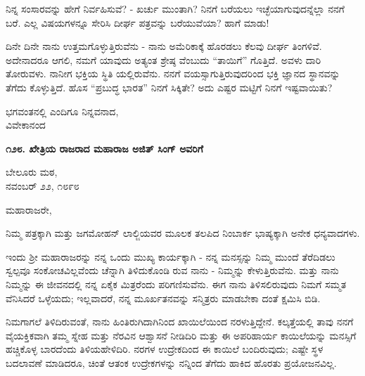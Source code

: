 ನಿನ್ನ ಸಂಸಾರವನ್ನು ಹೇಗೆ ನಿರ್ವಹಿಸುವೆ? - ಖರ್ಚು ಮುಂತಾಗಿ? ನಿನಗೆ ಬರೆಯಲು ಇಚ್ಛೆಯಾಗುವುದನ್ನೆಲ್ಲಾ ನನಗೆ ಬರೆ. ಎಲ್ಲ ವಿಷಯಗಳನ್ನೂ ಸೇರಿಸಿ ದೀರ್ಘ ಪತ್ರವನ್ನು ಬರೆಯುವೆಯಾ? ಹಾಗೆ ಮಾಡು!

ದಿನೇ ದಿನೇ ನಾನು ಉತ್ತಮಗೊಳ್ಳುತ್ತಿರುವೆನು - ನಾನು ಅಮೆರಿಕಾಕ್ಕೆ ಹೊರಡಲು ಕೆಲವು ದೀರ್ಘ ತಿಂಗಳಿವೆ. ಅದೇನಾದರೂ ಆಗಲಿ, ನಮಗೆ ಯಾವುದು ಅತ್ಯಂತ ಶ್ರೇಷ್ಠ ವೆಂಬುದು “ತಾಯಿಗೆ” ಗೊತ್ತಿದೆ. ಅವಳು ದಾರಿ ತೋರುವಳು. ನಾನೀಗ ಭಕ್ತಿಯ ಸ್ಥಿತಿ ಯಲ್ಲಿರುವೆನು. ನನಗೆ ವಯಸ್ಸಾಗುತ್ತಿರುವುದರಿಂದ ಭಕ್ತಿ ಜ್ಞಾನದ ಸ್ಥಾನವನ್ನು ತೆಗೆದು ಕೊಳ್ಳುತ್ತಿದೆ. ಹೊಸ “ಪ್ರಬುದ್ಧ ಭಾರತ” ನಿನಗೆ ಸಿಕ್ಕಿತೇ? ಅದು ಎಷ್ಟರ ಮಟ್ಟಿಗೆ ನಿನಗೆ ಇಷ್ಟವಾಯಿತು?

\begin{flushright}
ಭಗವಂತನಲ್ಲಿ ಎಂದಿಗೂ ನಿನ್ನವನಾದ,\\ವಿವೇಕಾನಂದ
\end{flushright}

\begin{center}
\textbf{೧೨೮. ಖೇತ್ರಿಯ ರಾಜರಾದ ಮಹಾರಾಜ ಅಜಿತ್ ಸಿಂಗ್ ಅವರಿಗೆ}
\end{center}

\begin{flushright}
ಬೇಲೂರು ಮಠ,\\ನವಂಬರ್ ೨೨, ೧೮೯೮
\end{flushright}

ಮಹಾರಾಜರೇ,

ನಿಮ್ಮ ಪತ್ರಕ್ಕಾಗಿ ಮತ್ತು ಜಗಮೋಹನ್ ಲಾಲ್ಜಿಯವರ ಮೂಲಕ ತಲಪಿದ ನಿಂಬಾರ್ಕ ಭಾಷ್ಯಕ್ಕಾಗಿ ಅನೇಕ ಧನ್ಯವಾದಗಳು.

ಇಂದು ಶ‍್ರೀ ಮಹಾರಾಜರನ್ನು ನನ್ನ ಒಂದು ಮುಖ್ಯ ಕಾರ್ಯಕ್ಕಾಗಿ - ನನ್ನ ಮನಸ್ಸನ್ನು ನಿಮ್ಮ ಮುಂದೆ ತೆರೆದಿಡಲು ಸ್ವಲ್ಪವೂ ಸಂಕೋಚವಿಲ್ಲವೆಂದು ಚೆನ್ನಾಗಿ ತಿಳಿದುಕೊಂಡಿ ರುವ ನಾನು - ನಿಮ್ಮನ್ನು ಕೇಳುತ್ತಿರುವೆನು. ಮತ್ತು ನಾನು ನಿಮ್ಮನ್ನು ಈ ಜೀವನದಲ್ಲಿ ನನ್ನ ಏಕೈಕ ಮಿತ್ರರೆಂದು ಪರಿಗಣಿಸುವೆನು. ಈಗ ನಾನು ತಿಳಿಸಲಿರುವುದು ನಿಮಗೆ ಸಮ್ಮತ ವೆನಿಸಿದರೆ ಒಳ್ಳೆಯದು; ಇಲ್ಲವಾದರೆ, ನನ್ನ ಮೂರ್ಖತನವನ್ನು ಸನ್ಮಿತ್ರರು ಮಾಡಬೇಕಾ ದಂತೆ ಕ್ಷಮಿಸಿ ಬಿಡಿ.

ನಿಮಗಾಗಲೆ ತಿಳಿದಿರುವಂತೆ, ನಾನು ಹಿಂತಿರುಗಿದಾಗಿನಿಂದ ಖಾಯಿಲೆಯಿಂದ ನರಳುತ್ತಿದ್ದೇನೆ. ಕಲ್ಕತ್ತೆಯಲ್ಲಿ ತಾವು ನನಗೆ ವೈಯಕ್ತಿಕವಾಗಿ ತಮ್ಮ ಸ್ನೇಹ ಮತ್ತು ನೆರವಿನ ಆಶ್ವಾಸನೆ ನೀಡಿದಿರಿ ಮತ್ತು ಈ ಅಪರಿಹಾರ್ಯ ಕಾಯಿಲೆಯನ್ನು ಮನಸ್ಸಿಗೆ ಹಚ್ಚಿಕೊಳ್ಳ ಬಾರದೆಂದು ತಿಳಿಯಹೇಳಿದಿರಿ. ನರಗಳ ಉದ್ರೇಕದಿಂದ ಈ ಕಾಯಿಲೆ ಬಂದಿರುವುದು; ಎಷ್ಟೇ ಸ್ಥಳ ಬದಲಾವಣೆ ಮಾಡಿದರೂ, ಚಿಂತೆ ಆತಂಕ ಉದ್ರೇಕಗಳನ್ನು ನನ್ನಿಂದ ತೆಗೆದು ಹಾಕಿದ ಹೊರತು ಪ್ರಯೋಜನವಿಲ್ಲ.

